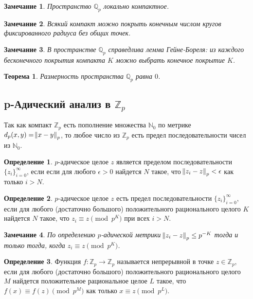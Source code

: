\documentclass[master, och, diploma, times]{sty/SCWorks}
\theoremstyle{plain}
\newtheorem{thethm}{Теорема}[section]
\newtheorem{note}{Замечание}[section]
\theoremstyle{definition}
\newtheorem{defn}{Определение}[section]
\begin{document}
\begin{note}
Пространство $\mathbb {Q}_p$ локально компактное.
\end{note}

\begin{note}
Всякий компакт можно покрыть конечным числом кругов фиксированного радиуса без общих точек.
\end{note}

\begin{note}
В пространстве $\mathbb {Q}_p$ справедлива лемма Гейне-Бореля: из каждого бесконечного покрытия компакта $K$ можно выбрать конечное покрытие $K$.
\end{note}

\begin{thethm}
Размерность пространства $\mathbb {Q}_p$ равна $0$.
\end{thethm}

\subsection{p-Адический анализ в $\mathbb {Z}_p$}

Так как компакт $\mathbb {Z}_p$ есть пополнение множества $\mathbb {N}_0$ по метрике \linebreak ${d_p(x,y)=\norm{x-y}_p}$, то любое число из $\mathbb {Z}_p$ есть предел последовательности чисел из $\mathbb {N}_0$.

\begin{defn}
$p$-адическое целое $z$ является пределом последовательности $\{z_i\}^{\infty}_{i=0}$, если если для любого $\epsilon > 0$ найдется $N$ такое, что $\norm{z_i-z}_p < \epsilon$ как только $i>N$. \cite{bib:analysis:anashin}
\end{defn}

\begin{defn}
$p$-адическое целое $z$ есть предел последовательности $\{z_i\}^{\infty}_{i=0}$, если для любого (достаточно большого) положительного рационального целого $K$ найдется $N$ такое, что ${z_i \equiv z \pmod p^K}$ при всех $i>N$. \cite{bib:analysis:anashin}
\end{defn}

\begin{note}
По определению $p$-адической метрики $\norm{z_i-z}_p \le p^{-K}$ тогда и только тогда, когда $z_i \equiv z \pmod p^K$. \cite{bib:analysis:anashin}
\end{note}

\begin{defn}
Функция $f:\mathbb {Z}_p \rightarrow \mathbb {Z}_p$ называется непрерывной в точке $z \in \mathbb {Z}_p$, если для любого (достаточно большого) положительного рационального целого $M$ найдется положительное рациональное целое $L$ такое, что ${f(x) \equiv f(z) \pmod p^M}$ как только $x \equiv z \pmod{p^L}$. \cite{bib:analysis:anashin}
\end{defn}
\end{document}
